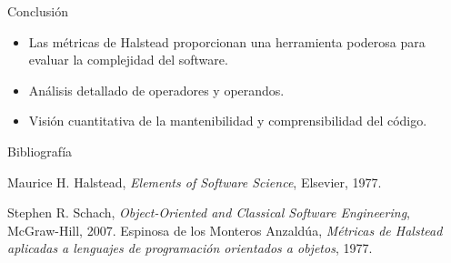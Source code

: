 \documentclass{beamer}
\begin{document}
\begin{frame}{Conclusión}
\begin{itemize}
    \item Las métricas de Halstead proporcionan una herramienta poderosa para evaluar la complejidad del software.
    \item Análisis detallado de operadores y operandos.
    \item Visión cuantitativa de la mantenibilidad y comprensibilidad del código.
\end{itemize}
\end{frame}

\begin{frame}{Bibliografía}
\begin{thebibliography}{9}
  Maurice H. Halstead,
  \textit{Elements of Software Science},
  Elsevier, 1977.

  Stephen R. Schach,
  \textit{Object-Oriented and Classical Software Engineering},
  McGraw-Hill, 2007.
  Espinosa de los Monteros Anzaldúa,
  \textit{Métricas de Halstead aplicadas a lenguajes de programación orientados a objetos},
  1977.
\end{thebibliography}
\end{frame}
\end{document}

